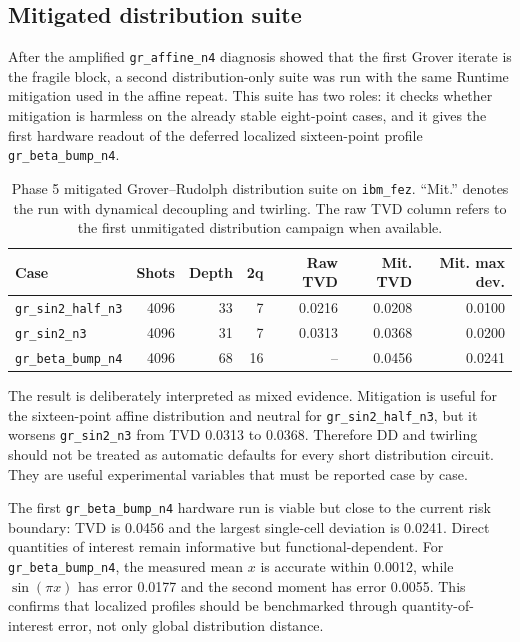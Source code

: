 \subsection{Mitigated distribution suite}

After the amplified \texttt{gr\_affine\_n4} diagnosis showed that the first
Grover iterate is the fragile block, a second distribution-only suite was run
with the same Runtime mitigation used in the affine repeat. This suite has two
roles: it checks whether mitigation is harmless on the already stable
eight-point cases, and it gives the first hardware readout of the deferred
localized sixteen-point profile \texttt{gr\_beta\_bump\_n4}.

\begin{table}[h]
\centering
\begin{tabular}{lrrrrrr}
\toprule
Case & Shots & Depth & 2q & Raw TVD & Mit. TVD & Mit. max dev. \\
\midrule
\texttt{gr\_sin2\_half\_n3} & 4096 & 33 & 7 & 0.0216 & 0.0208 & 0.0100 \\
\texttt{gr\_sin2\_n3} & 4096 & 31 & 7 & 0.0313 & 0.0368 & 0.0200 \\
\texttt{gr\_beta\_bump\_n4} & 4096 & 68 & 16 & -- & 0.0456 & 0.0241 \\
\bottomrule
\end{tabular}
\caption{Phase 5 mitigated Grover--Rudolph distribution suite on
\texttt{ibm\_fez}. ``Mit.'' denotes the run with dynamical decoupling and
twirling. The raw TVD column refers to the first unmitigated distribution
campaign when available.}
\label{tab:phase5-gr-distribution-suite}
\end{table}

The result is deliberately interpreted as mixed evidence. Mitigation is useful
for the sixteen-point affine distribution and neutral for
\texttt{gr\_sin2\_half\_n3}, but it worsens \texttt{gr\_sin2\_n3} from TVD
0.0313 to 0.0368. Therefore DD and twirling should not be treated as automatic
defaults for every short distribution circuit. They are useful experimental
variables that must be reported case by case.

The first \texttt{gr\_beta\_bump\_n4} hardware run is viable but close to the
current risk boundary: TVD is 0.0456 and the largest single-cell deviation is
0.0241. Direct quantities of interest remain informative but functional-dependent. For
\texttt{gr\_beta\_bump\_n4}, the measured mean \(x\) is accurate within
0.0012, while \(\sin(\pi x)\) has error 0.0177 and the second moment has error
0.0055. This confirms that localized profiles should be benchmarked through
quantity-of-interest error, not only global distribution distance.

